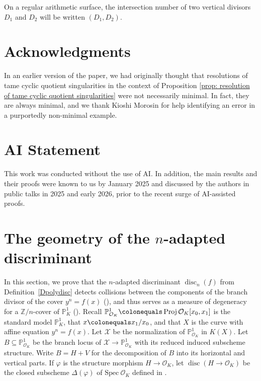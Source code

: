 \documentclass[12pt]{amsart}
\numberwithin{equation}{section}
\theoremstyle{definition}
\newcommand{\mc}[1]{\mathcal{#1}}
\newcommand{\ints}{\mathbb Z}
\newcommand{\proj}{\mathbb P}
\renewcommand{\phi}{\varphi}
\newcommand{\Spec}{\mathrm{Spec} \ }
\DeclareMathOperator{\disc}{disc}
\DeclareMathOperator{\Proj}{Proj}
\begin{document}
On a regular arithmetic surface, the intersection number of two
vertical divisors $D_1$ and $D_2$ will be written $(D_1, D_2)$.

\section*{Acknowledgments}
In an earlier version of the paper, we had originally thought that resolutions of tame cyclic quotient singularities in the context of Proposition \ref{prop: resolution of tame cyclic quotient singularities} were not necessarily minimal. In fact, they are always minimal, and we thank Kioshi Morosin for help identifying an error in a purportedly non-minimal example. 

\section*{AI Statement}
This work was conducted without the use of AI. In addition, the main results and their proofs were known to us by January 2025 and discussed by the authors in public talks in 2025 and early 2026, prior to the recent surge of AI-assisted proofs.


\section{The geometry of the $n$-adapted discriminant}\label{Sdiscgeometry}

In this section, we prove that the $n$-adapted discriminant $\disc_n(f)$ from Definition~\ref{Dpolydisc} detects collisions between the
components of the branch divisor of the cover $y^n=f(x)$ (), and thus serves as a measure of degeneracy for a $\ints/n$-cover of $\proj^1_K$ (). Recall $\proj^1_{\mc{O}_K} \colonequals \Proj \mc{O}_K[x_0, x_1]$ is the standard model $\proj^1_K$, that   
$x \colonequals x_1/x_0$, and that $X$ is the curve with affine equation $y^n=f(x)$. Let $\mc{X}$ be the normalization of  $\proj^1_{\mc{O}_K}$
 in $K(X)$.  Let $B \subseteq \proj^1_{\mc{O}_K}$ be the branch locus of
$\mc{X} \to \proj^1_{\mc{O}_K}$ with its reduced induced subscheme structure. Write $B = H + V$ for the decomposition of $B$ into
its horizontal and vertical parts.  If $\phi$ is the structure
morphism $H \to \mc{O}_K$, let $\disc(H \to \mc{O}_K)$ be the closed
subscheme $\Delta(\phi)$ of $\Spec
\mc{O}_K$ defined in \cite[Definition V-21]{EH}. 
\end{document}
